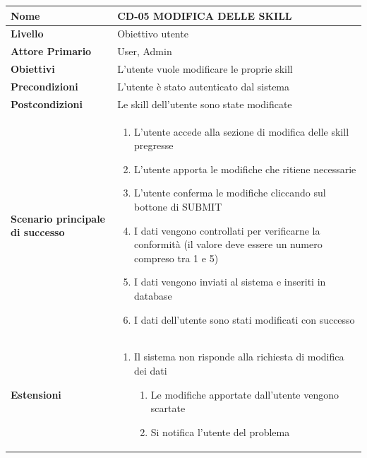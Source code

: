 \begin{center}
    \begin{tabular}{|p{0.3\linewidth}|p{0.7\linewidth}|}
    \hline
    \rowcolor{Blue}
    \textbf{Nome} & CD-05 MODIFICA DELLE SKILL  \\
    \hline
    \rowcolor{DarkBlue}
    \textbf{Livello} & Obiettivo utente \\
    \hline
    \rowcolor{LightBlue}
    \textbf{Attore Primario} & User, Admin \\
    \hline
    \rowcolor{LightBlue}
    \textbf{Obiettivi} & L'utente vuole modificare le proprie skill \\
    \hline
    \rowcolor{Blue}
    \textbf{Precondizioni} & L’utente è stato autenticato dal sistema \\
    \hline
    \rowcolor{LightBlue}
    \textbf{Postcondizioni} & Le skill dell’utente sono state modificate \\
    \hline
    \rowcolor{LighterBlue}
        \begin{center}
        \textbf{Scenario principale di successo}
    \end{center} 
    & 
    \begin{enumerate}
        \item L’utente accede alla sezione di modifica delle skill pregresse
        \item L’utente apporta le modifiche che ritiene necessarie
        \item L’utente conferma le modifiche cliccando sul bottone di SUBMIT
        \item I dati vengono controllati per verificarne la conformità (il valore deve essere un numero compreso tra 1 e 5)
        \item I dati vengono inviati al sistema e inseriti in database
        \item I dati dell’utente sono stati modificati con successo
    \end{enumerate}
    \\
    \hline
    \rowcolor{LighterBlue}
    \begin{center}
        \textbf{Estensioni}
    \end{center} 
    & 
    \begin{enumerate}
        \item Il sistema non risponde alla richiesta di modifica dei dati
        \begin{enumerate}
            \item Le modifiche apportate dall’utente vengono scartate
            \item Si notifica l’utente del problema
        \end{enumerate}
    \end{enumerate}
    \\
    \hline
    \end{tabular}
\end{center}

